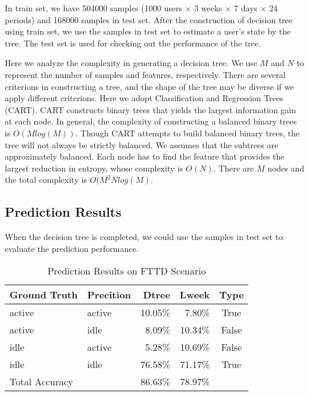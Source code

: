 \documentclass[journal]{IEEEtran}
\begin{document}
In train set, we have 504000 samples (1000 users $\times$ 3 weeks $\times$ 7 days $\times$ 24 periods) and 168000 samples in test set. After the construction of decision tree using train set, we use the samples in test set to estimate a user's state by the tree. The test set is used for checking out the performance of the tree.

Here we analyze the complexity in generating a decision tree. We use $M$ and $N$ to represent the number of samples and features, respectively. There are several criterions in constructing a tree, and the shape of the tree may be diverse if we apply different criterions. Here we adopt Classification and Regression Trees (CART). CART constructs binary trees that yields the largest information gain at each node. In general, the complexity of constructing a balanced binary trees is $O(Mlog(M))$. Though CART attempts to build balanced binary trees, the tree will not always be strictly balanced. We assumes that the subtrees are approximately balanced. Each node has to find the feature that provides the largest reduction in entropy, whose complexity is $O(N)$. There are $M$ nodes and the total complexity is $O(M^{2}Nlog(M)$.

\subsection{Prediction Results}
When the decision tree is completed, we could use the samples in test set to evaluate the prediction performance. 

\begin{table}[H]
\centering
\caption{Prediction Results on FTTD Scenario}
\label{table_FTTD}
\begin{tabular}{llrrc}
  \toprule
Ground Truth & Precition & Dtree & Lweek & Type\\  
  \midrule
active & active & 10.05\% & 7.80\% & True\\  
active & idle & 8.09\% & 10.34\% & False\\ 
idle & active & 5.28\% & 10.69\% & False\\
idle & idle & 76.58\% & 71.17\% & True\\ 
  \midrule
\qquad \qquad Total Accuracy &  & 86.63\% & 78.97\%\\ 
  \bottomrule
\end{tabular}  
\end{table}  
\end{document}
